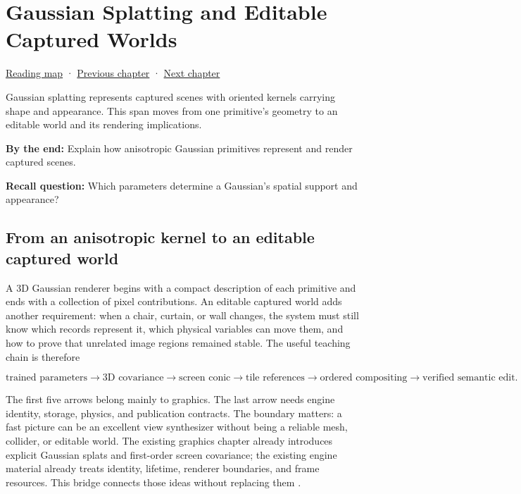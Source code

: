 \chapter{Gaussian Splatting and Editable Captured Worlds}\label{04-visual-computing-ii-ch037-gaussian-splatting-and-editable-captured-worlds}\hypertarget{04-visual-computing-ii-ch037}{}\label{stagechapter:04-visual-computing-ii-ch037}

\hyperref[volume-reading-map]{Reading map} · \hyperref[04-visual-computing-ii-ch036-source-atlas-and-reconstruction-checkpoints]{Previous chapter} · \hyperref[04-visual-computing-ii-ch038-projecting-ellipsoids-into-screen-space-conics]{Next chapter}

Gaussian splatting represents captured scenes with oriented kernels carrying shape and appearance. This span moves from one primitive's geometry to an editable world and its rendering implications.

\textbf{By the end:} Explain how anisotropic Gaussian primitives represent and render captured scenes.

\textbf{Recall question:} Which parameters determine a Gaussian's spatial support and appearance?

\section{From an anisotropic kernel to an editable captured world}\label{04-visual-computing-ii-ch037-from-an-anisotropic-kernel-to-an-editable-captured-world}

A 3D Gaussian renderer begins with a compact description of each primitive and ends with a collection of pixel contributions. An editable captured world adds another requirement: when a chair, curtain, or wall changes, the system must still know which records represent it, which physical variables can move them, and how to prove that unrelated image regions remained stable. The useful teaching chain is therefore

\[
\text{trained parameters}
\to \text{3D covariance}
\to \text{screen conic}
\to \text{tile references}
\to \text{ordered compositing}
\to \text{verified semantic edit}.
\]

The first five arrows belong mainly to graphics. The last arrow needs engine identity, storage, physics, and publication contracts. The boundary matters: a fast picture can be an excellent view synthesizer without being a reliable mesh, collider, or editable world. The existing graphics chapter already introduces explicit Gaussian splats and first-order screen covariance; the existing engine material already treats identity, lifetime, renderer boundaries, and frame resources. This bridge connects those ideas without replacing them .

